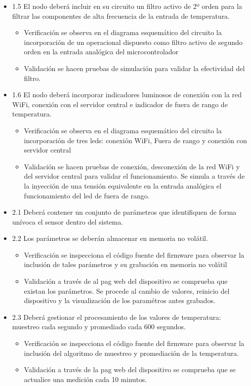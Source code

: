 \documentclass[11pt]{charter}
\begin{document}
\begin{itemize}
\item 1.5 El nodo deberá incluir en su circuito un filtro activo de 2º orden para la filtrar las componentes de alta frecuencia de la entrada de temperatura.
\begin{itemize}
\item Verificación se observa en el diagrama esquemático del circuito la incorporación de un operacional dispuesto como filtro activo de segundo orden en la entrada analógica del microcontrolador
\item Validación se hacen pruebas de simulación para validar la efectividad del filtro.
\end{itemize}

\item 1.6 El nodo deberá incorporar indicadores luminosos de conexión con la red WiFi, conexión con el servidor central e indicador de fuera de rango de temperatura.

\begin{itemize}
\item Verificación se observa en el diagrama esquemático del circuito la incorporación de tres leds: conexión WiFi, Fuera de rango y conexión con servidor central
\item Validación se hacen pruebas de conexión, desconexión de la red WiFi y del servidor central para validar el funcionamiento. Se simula a través de la inyección de una tensión equivalente en la entrada analógica el funcionamiento del led de fuera de rango.
\end{itemize}

\item 2.1 Deberá contener un conjunto de parámetros que identifiquen de forma unívoca el sensor dentro del sistema.
\item 2.2 Los parámetros se deberán almacenar en memoria no volátil.


\begin{itemize}
\item Verificación se inspecciona el código fuente del firmware para observar la inclusión de tales parámetros y su grabación en memoria no volátil
\item Validación a través de al pag web del dispositivo se comprueba que existan los parámetros. Se procede al cambio de valores, reinicio del dispositivo y la visualización de los paramétros antes grabados.
\end{itemize}

\item 2.3 Deberá gestionar el procesamiento de los valores de temperatura: muestreo cada segundo y promediado cada 600 segundos.
\begin{itemize}
\item Verificación se inspecciona el código fuente del firmware para observar la inclusión del algoritmo de muestreo y promediación de la temperatura.
\item Validación a través de la pag web del dispositivo se comprueba que se actualice una medición cada 10 minutos.
\end{itemize}


\end{itemize}
\end{document}
